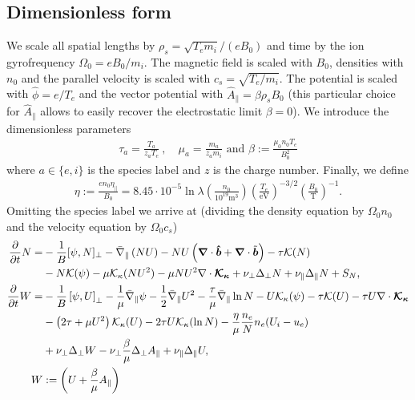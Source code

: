 \subsection{Dimensionless form}
We scale all spatial lengths by $\rho_s = \sqrt{T_e m_i}/(eB_0)$ and time by the ion gyrofrequency $\Omega_0 = eB_0/m_i$.
The magnetic field is scaled with $B_0$, densities with $n_0$ and the parallel velocity is scaled with $c_s = \sqrt{T_e/m_i}$.
The potential is scaled with $\hat \phi = e/T_e$ and the vector potential with 
$\hat A_\parallel = \beta \rho_s B_0$ (this particular choice for $\hat
A_\parallel$ allows to easily recover the electrostatic limit $\beta = 0$).
We introduce the dimensionless parameters
\begin{align}
  \tau_a = \frac{T_a}{z_aT_e}~,\quad \mu_a = \frac{m_a}{z_am_i}\text{ and } 
  \beta:=\frac{\mu_0 n_0 T_e}{B_0^2}
  \label{}
\end{align}
where $a\in\{e,i\}$ is the species label and $z$ is the charge number. Finally, we define
\begin{align}
  \eta:=\frac{en_0\eta_\parallel}{B_0} = 8.45\cdot 10^{-5}\ln \lambda \left(\frac{n_0}{10^{19}\text{m}^3}\right) \left(\frac{T_e}{\text{eV}}\right)^{-3/2} \left(\frac{B_0}{\text{T}}\right)^{-1}.
    \label{eq:resistivity}
\end{align}
Omitting the species label we arrive at (dividing the density equation by $\Omega_0n_0$ and the velocity equation by $\Omega_0 c_s$)
\begin{subequations}
    \begin{align}
    \frac{\partial}{\partial t} N =&
        - \frac{1}{B}[\psi, N]_{\perp}%
        - \bar \nabla_\parallel \left( NU\right)
        - NU\left(\vec \nabla\cdot\bhat+\vec \nabla\cdot\tilde{\vec b}\right)
        - \tau \mathcal K(N) \nonumber \\&
        - N \mathcal K(\psi)
        -\mu \mathcal K_\kappa(NU^2)
        -\mu NU^2\nabla\cdot \vec{ \mathcal K_\kappa}
        + \nu_\perp\Delta_\perp N + \nu_\parallel \Delta_\parallel N + S_N, \\
    \frac{\partial}{\partial t} W =&
        - \frac{1}{B}\left[\psi, U\right]_{\perp}%
        - \frac{1}{\mu} \bar \nabla_\parallel \psi%
        - \frac{1}{2}\bar \nabla_\parallel U^2
        -\frac{\tau}{\mu} \bar \nabla_\parallel \ln N
        - U\mathcal K_\kappa(\psi)
        - \tau \mathcal K(U)
        -\tau U\nabla\cdot\vec{ \mathcal K_\kappa}\nonumber\\&
        - \left(2\tau + {\mu}U^2\right) \mathcal K_\kappa (U)
        -2\tau U\mathcal K_\kappa(\ln N)
        - \frac{\eta}{\mu} \frac{n_e}{N}n_e(U_i - u_e) \nonumber\\&
        + \nu_\perp\Delta_\perp W
        - \nu_\perp\frac{\beta}{\mu}\Delta_\perp A_\parallel
        + \nu_\parallel \Delta_\parallel U,
        \label{eq:EgyrofluidU} \\
        W&:= \left( U + \frac{\beta}{\mu}A_\parallel\right)
    \end{align}
    \label{eq:Egyrofluid}
\end{subequations}
